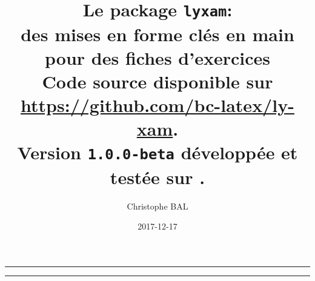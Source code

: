 \documentclass[12pt,a4paper]{scrartcl}
\begin{document}
\renewcommand\labelitemi{\raisebox{0.125em}{\tiny\textbullet}}
\renewcommand{\labelitemii}{---}

\title{%
	Le package \texttt{lyxam}:\\%
	des mises en forme clés en main\\%
	pour des fiches d'exercices\\%
	{\footnotesize Code source disponible sur \url{https://github.com/bc-latex/ly-xam}.}\\%
	{\footnotesize Version \texttt{1.0.0-beta} développée et testée sur \macosxname{}.}%
}
\author{Christophe BAL}
\date{2017-12-17}

\maketitle


\vspace{2em}

\hrule

\tableofcontents

\vspace{1.5em}

\hrule

\newpage

\end{document}
